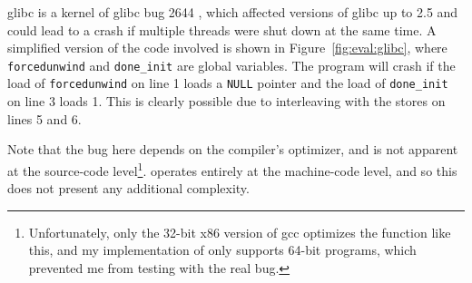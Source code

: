glibc is a kernel of glibc bug 2644 \cite{glibc2644}, which affected
versions of glibc up to 2.5 and could lead to a crash if multiple
threads were shut down at the same time.  A simplified version of the
code involved is shown in Figure~\ref{fig:eval:glibc}, where
\texttt{forcedunwind} and \texttt{done\_init} are global variables.
The program will crash if the load of \texttt{forcedunwind} on line 1
loads a \texttt{NULL} pointer and the load of \texttt{done\_init} on
line 3 loads 1.  This is clearly possible due to interleaving with the
stores on lines 5 and 6.

Note that the bug here depends on the compiler's optimizer, and is not
apparent at the source-code level\footnote{Unfortunately, only the
  32-bit x86 version of gcc optimizes the function like this, and my
  implementation of {\technique} only supports 64-bit programs, which
  prevented me from testing with the real bug.}.  {\Technique}
operates entirely at the machine-code level, and so this does not
present any additional complexity.

